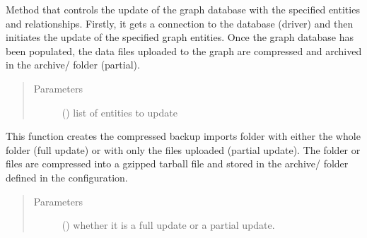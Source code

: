 \documentclass[letterpaper,10pt,english]{sphinxmanual}
\begin{document}

\begin{fulllineitems}
\label{\detokenize{_autosummary/graphdb_builder.builder:graphdb_builder.builder.loader.partialUpdate}}
Method that controls the update of the graph database with the specified entities and     relationships. Firstly, it gets a connection to the database (driver) and then initiates     the update of the specified graph entities.     Once the graph database has been populated, the data files uploaded to the graph are compressed     and archived in the archive/ folder (partial).
\begin{quote}\begin{description}
\item[{Parameters}] \leavevmode
{} () \textendash{} list of entities to update

\end{description}\end{quote}

\end{fulllineitems}


\begin{fulllineitems}
\label{\detokenize{_autosummary/graphdb_builder.builder:graphdb_builder.builder.loader.archiveImportDirectory}}
This function creates the compressed backup imports folder with either the whole folder     (full update) or with only the files uploaded (partial update). The folder or files are     compressed into a gzipped tarball file and stored in the archive/ folder defined in the     configuration.
\begin{quote}\begin{description}
\item[{Parameters}] \leavevmode
{} () \textendash{} whether it is a full update or a partial update.

\end{description}\end{quote}

\end{fulllineitems}
\end{document}
